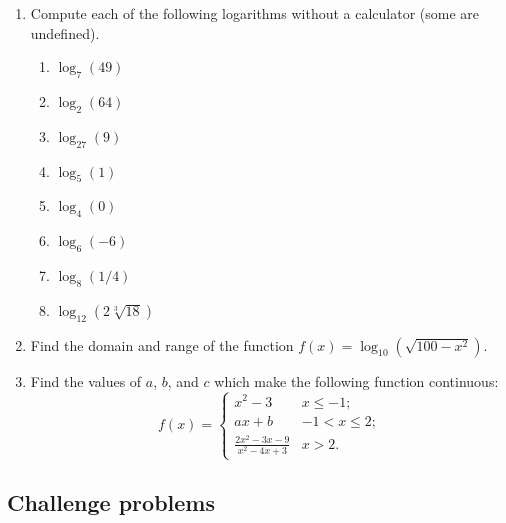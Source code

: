 \begin{enumerate}
\begin{enumerate}
\end{enumerate}
\item Compute each of the following logarithms without a calculator (some are undefined).
\begin{enumerate}
\item $\log_7(49)$
\item $\log_2(64)$
\item $\log_27(9)$
\item $\log_5(1)$
\item $\log_4(0)$
\item $\log_6(-6)$
\item $\log_8(1/4)$
\item $\log_{12}\left(2\sqrt[3]{18}\right)$
\end{enumerate}
\item Find the domain and range of the function $f(x) = \log_{10}\left(\sqrt{100 - x^2}\right)$.
\item Find the values of $a$, $b$, and $c$ which make the following function continuous:
\begin{equation*}
f(x) = \begin{cases} x^2 - 3 & x\leq -1; \\ ax + b & -1 < x\leq 2; \\ \frac{2x^2 - 3x - 9}{x^2 - 4x + 3} & x > 2. \end{cases}
\end{equation*}
\end{enumerate}


\subsection{Challenge problems}

